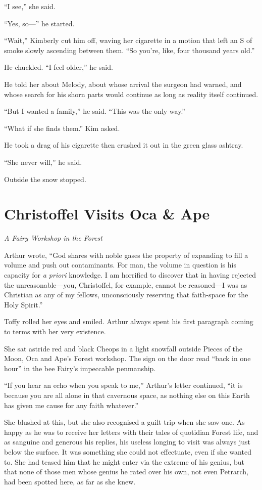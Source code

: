 \documentclass[11pt,a5paper]{article}
\newcommand{\alet}[1]{\textit{#1}\vspace{1em}}
\begin{document}
``I see,'' she said.

``Yes, so---'' he started.

``Wait,'' Kimberly cut him off, waving her cigarette in a motion that left an S of smoke slowly ascending between them. ``So you're, like, four thousand years old.''

He chuckled. ``I feel older,'' he said.

He told her about Melody, about whose arrival the surgeon had warned, and whose search for his shorn parts would continue as long as reality itself continued.

``But I wanted a family,'' he said. ``This was the only way.''

``What if she finds them.'' Kim asked.

He took a drag of his cigarette then crushed it out in the green glass ashtray.

``She never will,'' he said.

Outside the snow stopped.

\newpage

\section{Christoffel Visits Oca \& Ape}

\alet{A Fairy Workshop in the Forest}

 Arthur wrote, ``God shares with noble gases the property of expanding to fill a volume and push out contaminants. For man, the volume in question is his capacity for \emph{a priori} knowledge. I am horrified to discover that in having rejected the unreasonable---you, Christoffel, for example, cannot be reasoned---I was as Christian as any of my fellows, unconsciously reserving that faith-space for the Holy Spirit.''

Toffy rolled her eyes and smiled. Arthur always spent his first paragraph coming to terms with her very existence.

She sat astride red and black Cheops in a light snowfall outside Pieces of the Moon, Oca and Ape's Forest workshop. The sign on the door read ``{\sc back in one hour}'' in the bee Fairy's impeccable penmanship.

``If you hear an echo when you speak to me,'' Arthur's letter continued, ``it is because you are all alone in that cavernous space, as nothing else on this Earth has given me cause for any faith whatever.''

She blushed at this, but she also recognised a guilt trip when she saw one. As happy as he was to receive her letters with their tales of quotidian Forest life, and as sanguine and generous his replies, his useless longing to visit was always just below the surface. It was something she could not effectuate, even if she wanted to. She had teased him that he might enter via the extreme of his genius, but that none of those men whose genius he rated over his own, not even Petrarch, had been spotted here, as far as she knew.
\end{document}
